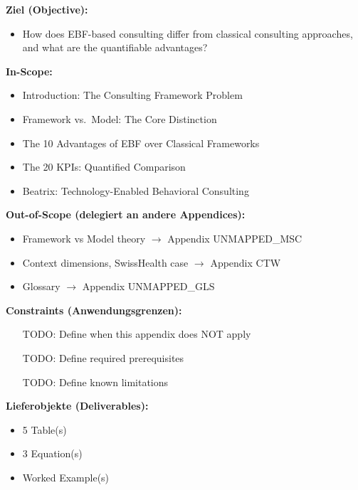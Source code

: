 \begin{tcolorbox}[
    colback=orange!5!white,
    colframe=orange!75!black,
    title={\textbf{Appendix Scope: Ziel / In-Scope / Out-of-Scope / Constraints}},
    fonttitle=\bfseries
]

\textbf{Ziel (Objective):}
\begin{itemize}[nosep]
    \item How does EBF-based consulting differ from classical consulting approaches,
and what are the quantifiable advantages?
\end{itemize}

\textbf{In-Scope:}
\begin{itemize}[nosep]
    \item Introduction: The Consulting Framework Problem
    \item Framework vs.\ Model: The Core Distinction
    \item The 10 Advantages of EBF over Classical Frameworks
    \item The 20 KPIs: Quantified Comparison
    \item Beatrix: Technology-Enabled Behavioral Consulting
\end{itemize}

\textbf{Out-of-Scope (delegiert an andere Appendices):}
\begin{itemize}[nosep]
    \item Framework vs Model theory $\rightarrow$ Appendix UNMAPPED_MSC
    \item Context dimensions, SwissHealth case $\rightarrow$ Appendix CTW
    \item Glossary $\rightarrow$ Appendix UNMAPPED_GLS
\end{itemize}

\textbf{Constraints (Anwendungsgrenzen):}
\begin{itemize}[nosep]
    \item [TODO: Define when this appendix does NOT apply]
    \item [TODO: Define required prerequisites]
    \item [TODO: Define known limitations]
\end{itemize}

\textbf{Lieferobjekte (Deliverables):}
\begin{itemize}[nosep]
    \item 5 Table(s)
    \item 3 Equation(s)
    \item Worked Example(s)
\end{itemize}

\end{tcolorbox}


